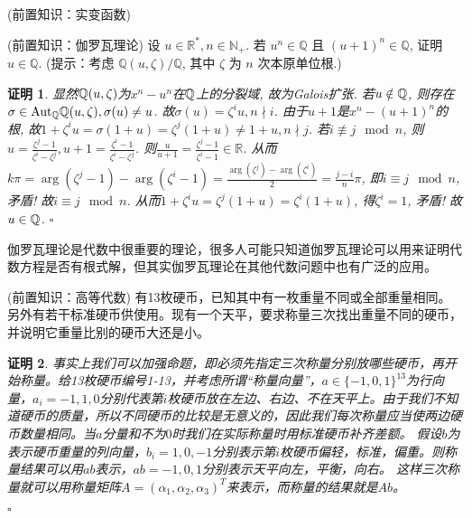 \documentclass[UTF8, a4paper, 12pt, oneside, twocolumn]{article}
\numberwithin{equation}{section}
\numberwithin{figure}{section}
\numberwithin{table}{section}
\def\R{\mathbb{R}}	%
\newtheorem*{Proof}{证明}
\newif\ifproof
\newenvironment{Ex}[1][]{\prooffalse \begin{EExercise}{#1}{}}%
{\ifproof%
\hfill\ensuremath{\square}\end{Proof}%
\fi%
\end{EExercise}}
\newcommand{\pr}{\tcblower \begin{Proof}\prooftrue }
\begin{document}
\newenvironment{myalign}%
{\vspace{-15pt}\vspace{-15pt}\begin{align*}}%
{\end{algin*}}
\maketitle
\thispagestyle{empty}
\begin{Ex}[(前置知识：实变函数)]{}
\begin{Ex}[(前置知识：伽罗瓦理论)]{}
	设 $u \in \mathbb{R}^*, n \in \mathbb{N}_{+}$. 若 $u^n \in \mathbb{Q}$ 且 $(u+1)^n \in \mathbb{Q}$, 证明 $u \in \mathbb{Q}$. (提示：考虑 $\mathbb{Q}(u, \zeta) / \mathbb{Q}$, 其中 $\zeta$ 为 $n$ 次本原单位根.)
	\pr
	\newcommand{\Aut}{\mathrm{Aut}}
	显然$\mathbb{Q}(u,\zeta)$为$x^n-u^n$在$\mathbb{Q}$上的分裂域, 故为Galois扩张.
	若$u\notin\mathbb{Q}$, 则存在$\sigma\in\Aut_\Q\Q(u,\zeta),\sigma(u)\neq u$.
	故$\sigma(u)=\zeta^i u,n\nmid i$. 由于$u+1$是$x^n-(u+1)^n$的根, 故$1+\zeta^i u=\sigma(1+u)=\zeta^j(1+u)\neq 1+u,n\nmid j$.
	若$i\not\equiv j\mod n$, 则$u=\frac{\zeta^j-1}{\zeta^i-\zeta^j},u+1=\frac{\zeta^i-1}{\zeta^i-\zeta^j}$.
	则$\frac{u}{u+1}=\frac{\zeta^j-1}{\zeta^i-1}\in\R$.
	从而$k\pi=\arg(\zeta^j-1)-\arg(\zeta^i-1)=\frac{\arg(\zeta^j)-\arg(\zeta^i)}{2}=\frac{j-i}{n}\pi$, 即$i\equiv j\mod n$, 矛盾!
	故$i\equiv j\mod n$. 从而$1+\zeta^i u=\zeta^j(1+u)=\zeta^i(1+u)$, 得$\zeta^i=1$, 矛盾! 故$u\in\mathbb{Q}$.
\end{Ex}
\begin{Remark}{}{}
	伽罗瓦理论是代数中很重要的理论，很多人可能只知道伽罗瓦理论可以用来证明代数方程是否有根式解，但其实伽罗瓦理论在其他代数问题中也有广泛的应用。
\end{Remark}
\begin{Ex}[(前置知识：高等代数)]{}
	有13枚硬币，已知其中有一枚重量不同或全部重量相同。另外有若干标准硬币供使用。现有一个天平，要求称量三次找出重量不同的硬币，并说明它重量比别的硬币大还是小。
	\pr
	事实上我们可以加强命题，即必须先指定三次称量分别放哪些硬币，再开始称量。给13枚硬币编号1-13，并考虑所谓“称量向量”，$a\in\{-1,0,1\}^{13}$为行向量，$a_i=-1,1,0$分别代表第$i$枚硬币放在左边、右边、不在天平上。由于我们不知道硬币的质量，所以不同硬币的比较是无意义的，因此我们每次称量应当使两边硬币数量相同。当$a$分量和不为$0$时我们在实际称量时用标准硬币补齐差额。
	假设$b$为表示硬币重量的列向量，$b_i=1,0,-1$分别表示第$i$枚硬币偏轻，标准，偏重。则称量结果可以用$ab$表示，$ab=-1,0,1$分别表示天平向左，平衡，向右。
	这样三次称量就可以用称量矩阵$A=(\alpha_1,\alpha_2,\alpha_3)^T$来表示，而称量的结果就是$Ab$。

\end{Ex}
\end{Ex}
\end{document}
